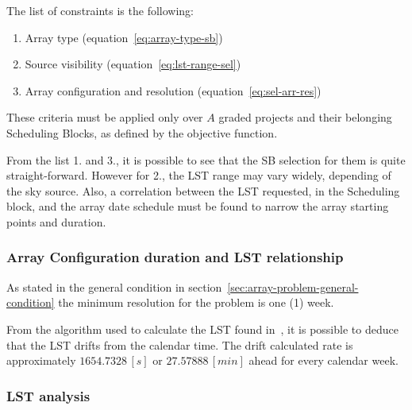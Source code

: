 \begin{description}
The list of constraints is the following:
\begin{enumerate}
\item Array type (equation~\ref{eq:array-type-sb})
\item Source visibility (equation~\ref{eq:lst-range-sel})
\item Array configuration and resolution (equation~\ref{eq:sel-arr-res})
\end{enumerate}
These criteria must be applied only over $A$ graded projects and their belonging Scheduling Blocks, as defined by the objective function.

From the list 1. and 3., it is possible to see that the SB selection for them is quite straight-forward. However for 2., the LST range may vary widely, depending of the sky source. Also, a correlation between the LST requested, in the Scheduling block, and the array date schedule must be found to narrow the array starting points and duration.

\subsubsection{Array Configuration duration and LST relationship}
As stated in the general condition in section~\ref{sec:array-problem-general-condition} the minimum resolution for the problem is one (1) week.

From the algorithm used to calculate the LST found in~\cite{kaplan05}, it is possible to deduce that the LST drifts from the calendar time. The drift calculated rate is approximately $1654.7328\,[s]$ or $27.57888\,[min]$ ahead for every calendar week.

\subsubsection{LST analysis}



\end{description}
